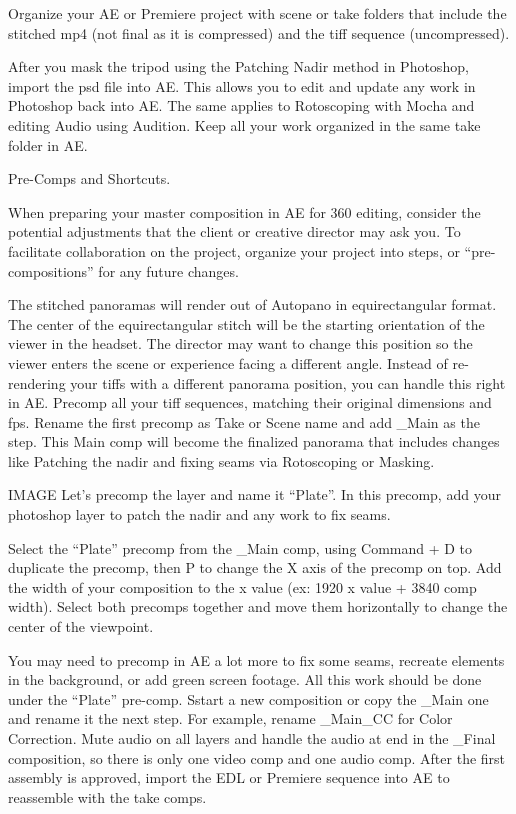 \begin{fullwidth}
Organize your AE or Premiere project with scene or take folders that include the stitched mp4 (not final as it is compressed) and the tiff sequence (uncompressed). 

After you mask the tripod using the Patching Nadir method in Photoshop, import the psd file into AE. This allows you to edit and update any work in Photoshop back into AE. The same applies to Rotoscoping with Mocha and editing Audio using Audition. Keep all your work organized in the same take folder in AE.


{\large Pre-Comps and Shortcuts. \par}

When preparing your master composition in AE for 360 editing, consider the potential adjustments that the client or creative director may ask you. To facilitate collaboration on the project, organize your project into steps, or “pre-compositions” for any future changes. 

The stitched panoramas will render out of Autopano in equirectangular format. The center of the equirectangular stitch will be the starting orientation of the viewer in the headset. The director may want to change this position so the viewer enters the scene or experience facing a different angle. Instead of re-rendering your tiffs with a different panorama position, you can handle this right in AE. Precomp all your tiff sequences, matching their original dimensions and fps. Rename the first precomp as Take or Scene name and add \_Main as the step. This Main comp will become the finalized panorama that includes changes like Patching the nadir and fixing seams via Rotoscoping or Masking. 

IMAGE
Let’s precomp the layer and name it “Plate”. In this precomp, add your photoshop layer to patch the nadir and any work to fix seams. 

Select the “Plate” precomp from the \_Main comp, using Command + D to duplicate the precomp, then P to change the X axis of the precomp on top. Add the width of your composition to the x value (ex: 1920 x value + 3840 comp width). Select both precomps together and move them horizontally to change the center of the viewpoint.

You may need to precomp in AE a lot more to fix some seams, recreate elements in the background, or add green screen footage. All this work should be done under the “Plate” pre-comp. Sstart a new composition or copy the \_Main one and rename it the next step. For example, rename \_Main\_CC for Color Correction. Mute audio on all layers and handle the audio at end in the \_Final composition, so there is only one video comp and one audio comp. After the first assembly is approved, import the EDL or Premiere sequence into AE to reassemble with the take comps.


\end{fullwidth}
